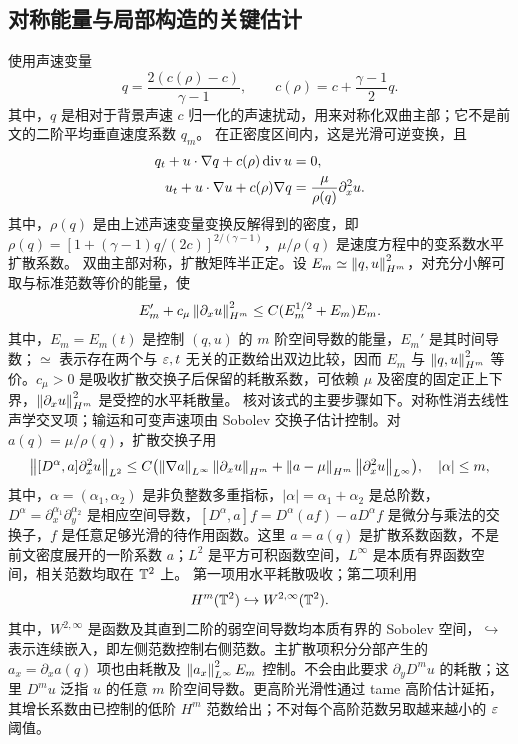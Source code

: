 \subsection{对称能量与局部构造的关键估计}
使用声速变量
\[
 q=\frac{2(c(\rho)-c)}{\gamma-1},\qquad
 c(\rho)=c+\frac{\gamma-1}{2}q.
\]
其中，$q$ 是相对于背景声速 $c$ 归一化的声速扰动，用来对称化双曲主部；它不是前文的二阶平均垂直速度系数 $q_m$。
在正密度区间内，这是光滑可逆变换，且
\begin{equation}\label{eq:symmetric}
 \begin{aligned}
 q_t+u\cdot\nabla q+c(\rho)\operatorname{div} u&=0,\\
 u_t+u\cdot\nabla u+c(\rho)\nabla q&=\frac\mu{\rho(q)}\partial_x^2u.
 \end{aligned}
\end{equation}
其中，$\rho(q)$ 是由上述声速变量变换反解得到的密度，即 $\rho(q)=[1+(\gamma-1)q/(2c)]^{2/(\gamma-1)}$，$\mu/\rho(q)$ 是速度方程中的变系数水平扩散系数。
双曲主部对称，扩散矩阵半正定。设 $E_m\simeq\left\|q,u\right\|_{H^m}^2$，对充分小解可取与标准范数等价的能量，使
\begin{equation}\label{eq:energyhigh}
 E_m'+c_\mu\left\|\partial_xu\right\|_{H^m}^2
 \le C(E_m^{1/2}+E_m)E_m.
\end{equation}
其中，$E_m=E_m(t)$ 是控制 $(q,u)$ 的 $m$ 阶空间导数的能量，$E_m'$ 是其时间导数；$\simeq$ 表示存在两个与 $\varepsilon,t$ 无关的正数给出双边比较，因而 $E_m$ 与 $\left\|q,u\right\|_{H^m}^2$ 等价。$c_\mu>0$ 是吸收扩散交换子后保留的耗散系数，可依赖 $\mu$ 及密度的固定正上下界，$\left\|\partial_xu\right\|_{H^m}^2$ 是受控的水平耗散量。
核对该式的主要步骤如下。对称性消去线性声学交叉项；输运和可变声速项由 Sobolev 交换子估计控制。对 $a(q)=\mu/\rho(q)$，扩散交换子用
\[
 \left\|[D^\alpha,a]\partial_x^2u\right\|_{L^2}
 \le C\bigl(\left\|\nabla a\right\|_{L^\infty}\left\|\partial_xu\right\|_{H^m}
       +\left\|a-\mu\right\|_{H^m}\left\|\partial_x^2u\right\|_{L^\infty}\bigr),
 \quad |\alpha|\le m,
\]
其中，$\alpha=(\alpha_1,\alpha_2)$ 是非负整数多重指标，$|\alpha|=\alpha_1+\alpha_2$ 是总阶数，$D^\alpha=\partial_x^{\alpha_1}\partial_y^{\alpha_2}$ 是相应空间导数，$[D^\alpha,a]f=D^\alpha(af)-aD^\alpha f$ 是微分与乘法的交换子，$f$ 是任意足够光滑的待作用函数。这里 $a=a(q)$ 是扩散系数函数，不是前文密度展开的一阶系数 $a$；$L^2$ 是平方可积函数空间，$L^\infty$ 是本质有界函数空间，相关范数均取在 $\mathbb T^2$ 上。
第一项用水平耗散吸收；第二项利用
\[
 H^m(\mathbb T^2)\hookrightarrow W^{2,\infty}(\mathbb T^2).
\]
其中，$W^{2,\infty}$ 是函数及其直到二阶的弱空间导数均本质有界的 Sobolev 空间，$\hookrightarrow$ 表示连续嵌入，即左侧范数控制右侧范数。主扩散项积分分部产生的 $a_x=\partial_xa(q)$ 项也由耗散及 $\left\|a_x\right\|_{L^\infty}^2E_m$ 控制。不会由此要求 $\partial_yD^mu$ 的耗散；这里 $D^mu$ 泛指 $u$ 的任意 $m$ 阶空间导数。更高阶光滑性通过 tame 高阶估计延拓，其增长系数由已控制的低阶 $H^m$ 范数给出；不对每个高阶范数另取越来越小的 $\varepsilon$ 阈值。

